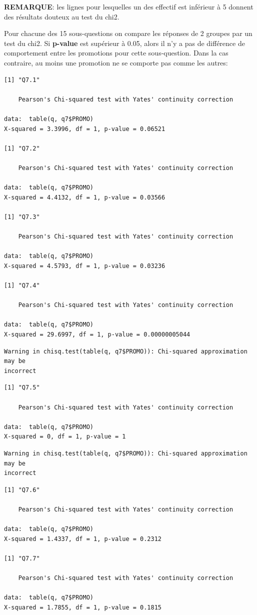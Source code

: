 \documentclass[]{article}
\begin{document}
\textbf{REMARQUE}: les lignes pour lesquelles un des effectif est
inférieur à 5 donnent des résultats douteux au test du chi2.

Pour chacune des 15 sous-questions on compare les réponses de 2 groupes
par un test du chi2. Si \textbf{p-value} est supérieur à 0.05, alors il
n'y a pas de différence de comportement entre les promotions pour cette
sous-question. Dans la cas contraire, au moins une promotion ne se
comporte pas comme les autres:

\begin{verbatim}
[1] "Q7.1"

    Pearson's Chi-squared test with Yates' continuity correction

data:  table(q, q7$PROMO)
X-squared = 3.3996, df = 1, p-value = 0.06521

[1] "Q7.2"

    Pearson's Chi-squared test with Yates' continuity correction

data:  table(q, q7$PROMO)
X-squared = 4.4132, df = 1, p-value = 0.03566

[1] "Q7.3"

    Pearson's Chi-squared test with Yates' continuity correction

data:  table(q, q7$PROMO)
X-squared = 4.5793, df = 1, p-value = 0.03236

[1] "Q7.4"

    Pearson's Chi-squared test with Yates' continuity correction

data:  table(q, q7$PROMO)
X-squared = 29.6997, df = 1, p-value = 0.00000005044
\end{verbatim}

\begin{verbatim}
Warning in chisq.test(table(q, q7$PROMO)): Chi-squared approximation may be
incorrect
\end{verbatim}

\begin{verbatim}
[1] "Q7.5"

    Pearson's Chi-squared test with Yates' continuity correction

data:  table(q, q7$PROMO)
X-squared = 0, df = 1, p-value = 1
\end{verbatim}

\begin{verbatim}
Warning in chisq.test(table(q, q7$PROMO)): Chi-squared approximation may be
incorrect
\end{verbatim}

\begin{verbatim}
[1] "Q7.6"

    Pearson's Chi-squared test with Yates' continuity correction

data:  table(q, q7$PROMO)
X-squared = 1.4337, df = 1, p-value = 0.2312

[1] "Q7.7"

    Pearson's Chi-squared test with Yates' continuity correction

data:  table(q, q7$PROMO)
X-squared = 1.7855, df = 1, p-value = 0.1815
\end{verbatim}
\end{document}
